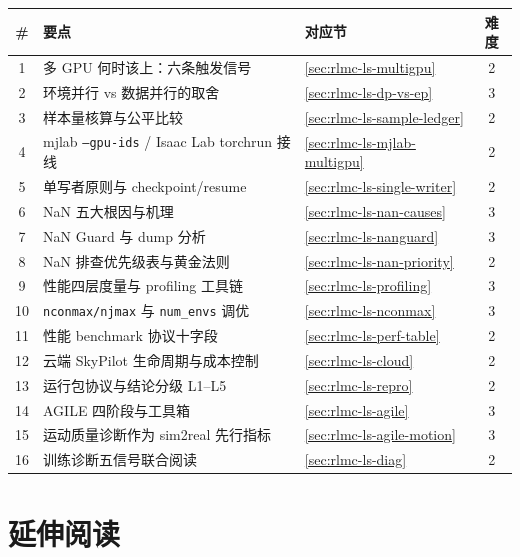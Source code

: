 \begin{table}[H]\centering\small
\begin{tabular}{@{}cp{7.6cm}p{2.6cm}c@{}}
\toprule
\# & 要点 & 对应节 & 难度 \\
\midrule
1 & 多 GPU 何时该上：六条触发信号 & \cref{sec:rlmc-ls-multigpu} & 2 \\
2 & 环境并行 vs 数据并行的取舍 & \cref{sec:rlmc-ls-dp-vs-ep} & 3 \\
3 & 样本量核算与公平比较 & \cref{sec:rlmc-ls-sample-ledger} & 2 \\
4 & mjlab \texttt{--gpu-ids} / Isaac Lab torchrun 接线 & \cref{sec:rlmc-ls-mjlab-multigpu} & 2 \\
5 & 单写者原则与 checkpoint/resume & \cref{sec:rlmc-ls-single-writer} & 2 \\
6 & NaN 五大根因与机理 & \cref{sec:rlmc-ls-nan-causes} & 3 \\
7 & NaN Guard 与 dump 分析 & \cref{sec:rlmc-ls-nanguard} & 3 \\
8 & NaN 排查优先级表与黄金法则 & \cref{sec:rlmc-ls-nan-priority} & 2 \\
9 & 性能四层度量与 profiling 工具链 & \cref{sec:rlmc-ls-profiling} & 3 \\
10 & \texttt{nconmax/\allowbreak njmax} 与 \texttt{num\_envs} 调优 & \cref{sec:rlmc-ls-nconmax} & 3 \\
11 & 性能 benchmark 协议十字段 & \cref{sec:rlmc-ls-perf-table} & 2 \\
12 & 云端 SkyPilot 生命周期与成本控制 & \cref{sec:rlmc-ls-cloud} & 2 \\
13 & 运行包协议与结论分级 L1--L5 & \cref{sec:rlmc-ls-repro} & 2 \\
14 & AGILE 四阶段与工具箱 & \cref{sec:rlmc-ls-agile} & 3 \\
15 & 运动质量诊断作为 sim2real 先行指标 & \cref{sec:rlmc-ls-agile-motion} & 3 \\
16 & 训练诊断五信号联合阅读 & \cref{sec:rlmc-ls-diag} & 2 \\
\bottomrule
\end{tabular}
\end{table}

\section{延伸阅读}
\label{sec:rlmc-ls-further}

